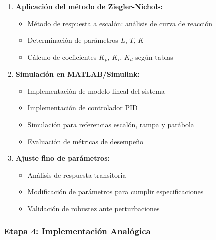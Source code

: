 \documentclass[conference]{IEEEtran}
\begin{document}
\begin{enumerate}
\item \textbf{Aplicación del método de Ziegler-Nichols:}
\begin{itemize}
\item Método de respuesta a escalón: análisis de curva de reacción
\item Determinación de parámetros $L$, $T$, $K$
\item Cálculo de coeficientes $K_p$, $K_i$, $K_d$ según tablas
\end{itemize}

\item \textbf{Simulación en MATLAB/Simulink:}
\begin{itemize}
\item Implementación de modelo lineal del sistema
\item Implementación de controlador PID
\item Simulación para referencias escalón, rampa y parábola
\item Evaluación de métricas de desempeño
\end{itemize}

\item \textbf{Ajuste fino de parámetros:}
\begin{itemize}
\item Análisis de respuesta transitoria
\item Modificación de parámetros para cumplir especificaciones
\item Validación de robustez ante perturbaciones
\end{itemize}
\end{enumerate}

\subsubsection{Etapa 4: Implementación Analógica}
\end{document}
